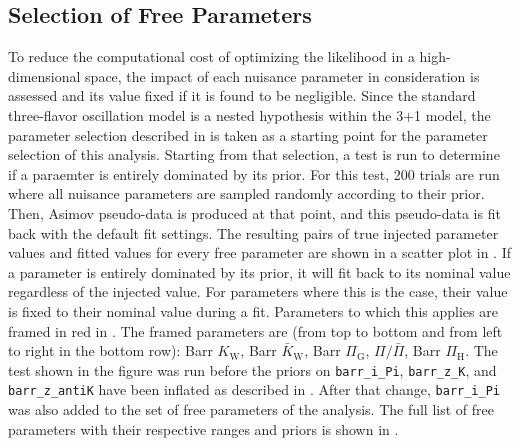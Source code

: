 \subsection{Selection of Free Parameters}
\label{sec:sterile-analysis-parameter-selection}
To reduce the computational cost of optimizing the likelihood in a high-dimensional space, the impact of each nuisance parameter in consideration is assessed and its value fixed if it is found to be negligible.
Since the standard three-flavor oscillation model is a nested hypothesis within the 3+1 model, the parameter selection described in  is taken as a starting point for the parameter selection of this analysis.
Starting from that selection, a test is run to determine if a paraemter is entirely dominated by its prior.
For this test, 200 trials are run where all nuisance parameters are sampled randomly according to their prior.
Then,  Asimov pseudo-data is produced at that point, and this pseudo-data is fit back with the default fit settings.
The resulting pairs of true injected parameter values and fitted values for every free parameter are shown in a scatter plot in .
If a parameter is entirely dominated by its prior, it will fit back to its nominal value regardless of the injected value.
For parameters where this is the case, their value is fixed to their nominal value during a fit.
Parameters to which this applies are framed in red in .
The framed parameters are (from top to bottom and from left to right in the bottom row): Barr $K_\mathrm{W}$, Barr $\bar{K}_\mathrm{W}$, Barr $\Pi_\mathrm{G}$, $\Pi/\bar{\Pi}$, Barr $\Pi_\mathrm{H}$.
The test shown in the figure was run before the priors on \texttt{barr\_i\_Pi}, \texttt{barr\_z\_K}, and \texttt{barr\_z\_antiK} have been inflated as described in .
After that change,  \texttt{barr\_i\_Pi} was also added to the set of free parameters of the analysis.
The full list of free parameters with their respective ranges and priors is shown in .

